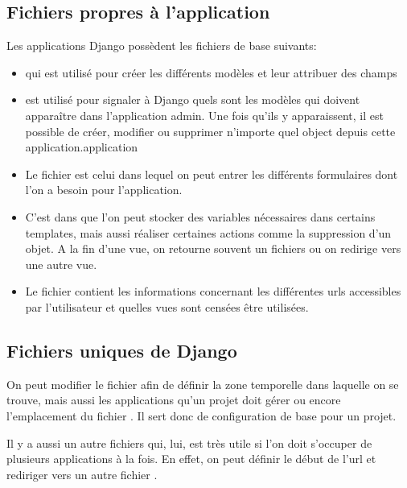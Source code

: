\documentclass[letterpaper,10pt,french]{sphinxmanual}
\begin{document}
\subsection{Fichiers propres à l'application}
\label{documentation:fichiers-propres-a-l-application}
Les applications Django possèdent les fichiers de base suivants:
\begin{itemize}
\item {} 
 qui est utilisé pour créer les différents modèles et leur
attribuer des champs

\item {} 
 est utilisé pour signaler à Django quels sont les modèles qui
doivent apparaître dans l'application admin. Une fois qu'ils y apparaissent,
il est possible de créer, modifier ou supprimer n'importe quel object depuis
cette application.application

\item {} 
Le fichier  est celui dans lequel on peut entrer les différents
formulaires dont l'on a besoin pour l'application.

\item {} 
C'est dans  que l'on peut stocker des variables nécessaires
dans certains templates, mais aussi réaliser certaines actions comme la
suppression d'un objet. A la fin d'une vue, on retourne souvent un fichiers
 ou on redirige vers une autre vue.

\item {} 
Le fichier  contient les informations concernant les différentes
urls accessibles par l'utilisateur et quelles vues sont censées être
utilisées.

\end{itemize}


\subsection{Fichiers uniques de Django}
\label{documentation:fichiers-uniques-de-django}
On peut modifier le fichier  afin de définir la zone temporelle
dans laquelle on se trouve, mais aussi les applications qu'un projet doit
gérer ou encore l'emplacement du fichier . Il sert donc de
configuration de base pour un projet.

Il y a aussi un autre fichiers  qui, lui, est très utile si l'on doit
s'occuper de plusieurs applications à la fois. En effet, on peut définir le
début de l'url et rediriger vers un autre fichier .
\end{document}
